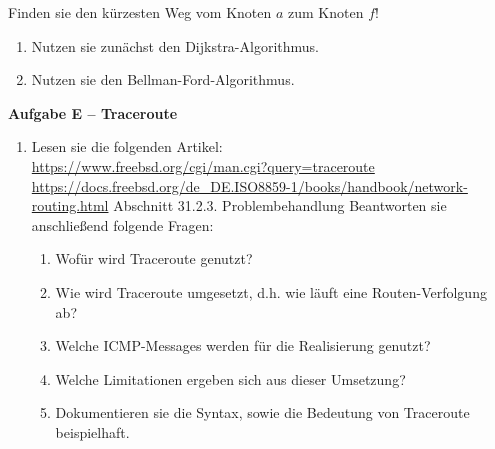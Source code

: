 \documentclass[paper=a4,fontsize=11pt]{scrartcl}%
\numberwithin{equation}{section}
\begin{document}
\begin{enumerate}
\begin{figure}[H]
	\end{figure}
	Finden sie den kürzesten Weg vom Knoten $a$ zum Knoten $f$!
	\begin{enumerate}
		\item Nutzen sie zunächst den Dijkstra-Algorithmus.
		\item Nutzen sie den Bellman-Ford-Algorithmus.
	\end{enumerate}
\end{enumerate}

\begin{center}\Large{\textbf{Aufgabe E -- Traceroute}}\end{center}\vskip0.2in
\begin{enumerate}
	\item Lesen sie die folgenden Artikel:\\
	\url{https://www.freebsd.org/cgi/man.cgi?query=traceroute}\\
	\url{https://docs.freebsd.org/de_DE.ISO8859-1/books/handbook/network-routing.html} Abschnitt 31.2.3. Problembehandlung
	Beantworten sie anschließend folgende Fragen:
	\begin{enumerate}
		\item Wofür wird Traceroute genutzt?
		\item Wie wird Traceroute umgesetzt, d.h. wie läuft eine Routen-Verfolgung ab? 
		\item Welche ICMP-Messages werden für die Realisierung genutzt?
		\item Welche Limitationen ergeben sich aus dieser Umsetzung?
		\item Dokumentieren sie die Syntax, sowie die Bedeutung von Traceroute beispielhaft.
	\end{enumerate}
\end{enumerate}	
\end{document}
